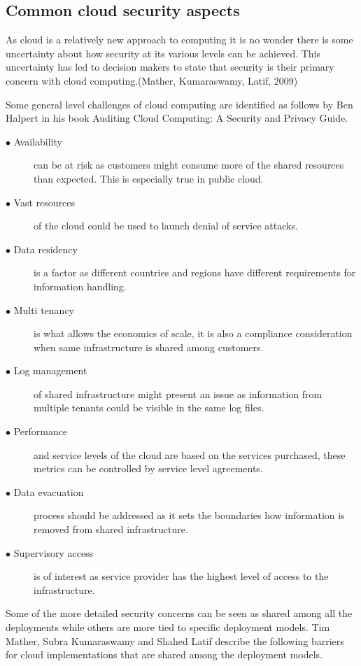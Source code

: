 \documentclass{article}
\begin{document}
\subsection{Common cloud security aspects}
As cloud is a relatively new approach to computing it is no wonder there is some uncertainty about how security at its various levels can be achieved. This uncertainty has led to decision makers to state that security is their primary concern with cloud computing.(Mather, Kumaraswamy, Latif, 2009)
\par
Some general level challenges of cloud computing are identified as follows by Ben Halpert in his book Auditing Cloud Computing: A Security and Privacy Guide.
\begin{description}
	\item[$\bullet$ Availability] can be at risk as customers might consume more of the shared resources than expected. This is especially true in public cloud.
	\item[$\bullet$ Vast resources] of the cloud could be used to launch denial of service attacks.
	\item[$\bullet$ Data residency] is a factor as different countries and regions have different requirements for information handling.
	\item[$\bullet$ Multi tenancy] is what allows the economics of scale, it is also a compliance consideration when same infrastructure is shared among customers.
	\item[$\bullet$ Log management] of shared infrastructure might present an issue as information from multiple tenants could be visible in the same log files. 
	\item[$\bullet$ Performance] and service levels of the cloud are based on the services purchased, these metrics can be controlled by service level agreements.
	\item[$\bullet$ Data evacuation] process should be addressed as it sets the boundaries how information is removed from shared infrastructure.
	\item[$\bullet$ Supervisory access] is of interest as service provider has the highest level of access to the infrastructure.
\end{description}
Some of the more detailed security concerns can be seen as shared among all the deployments while others are more tied to specific deployment models.
Tim Mather, Subra Kumaraswamy and Shahed Latif describe the following barriers for cloud implementations that are shared among the deployment models.
\end{document}
